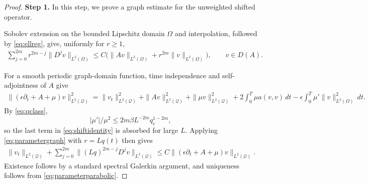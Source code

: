 \documentclass[print,wide,eng]{draft}
\begin{document}
\begin{proof}
{\bf Step 1.} In this step,
we prove a graph estimate for the unweighted shifted operator.

Sobolev extension on the bounded Lipschitz domain $\Omega$ and interpolation, followed by \cref{eq:ellreg}, give, uniformly for $r\geq1$,
%
\begin{align}\label{eq:parametergraph}
\sum_{j=0}^{2m}r^{2m-j}\|D^jv\|_{L^2(\Omega)}
\leq C\bigl(\|Av\|_{L^2(\Omega)}+r^{2m}\|v\|_{L^2(\Omega)}\bigr),
\qquad v\in D(A).
\end{align}
%

For a smooth periodic graph-domain function, time independence and self-adjointness of $A$ give
%
\begin{align}\label{eq:shiftidentity}
\|(\epsilon\partial_t+A+\mu)v\|_{L^2(\mathcal Q)}^2
=
\|v_t\|_{L^2(\mathcal Q)}^2+\|Av\|_{L^2(\mathcal Q)}^2+\|\mu v\|_{L^2(\mathcal Q)}^2
+2\int_0^T\mu a(v,v)\,dt
-\epsilon\int_0^T\mu'\|v\|_{L^2(\Omega)}^2\,dt.
\end{align}
%
By \cref{eq:qclass}, $$|\mu'|/\mu^2\leq2m\beta L^{-2m}q_c^{1-2m},$$ so the last term in \cref{eq:shiftidentity} is absorbed for large $L$. Applying \cref{eq:parametergraph} with $r=Lq(t)$ then gives
%
\begin{align}\label{eq:parameterparabolic}
\|v_t\|_{L^2(\mathcal Q)}+\sum_{j=0}^{2m}\|(Lq)^{2m-j}D^jv\|_{L^2(\mathcal Q)}
\leq C\|(\epsilon\partial_t+A+\mu)v\|_{L^2(\mathcal Q)}.
\end{align}
%
Existence follows by a standard spectral Galerkin argument, and uniqueness follows from \cref{eq:parameterparabolic}.

\medskip


\end{proof}
\end{document}
